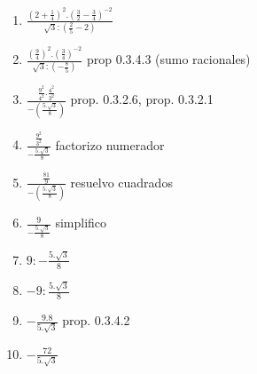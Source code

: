     \begin{enumerate}
        \item $ \frac{\left( 2+ \frac{1}{4} \right)^{2} . \left( \frac{3}{2}-\frac{3}{4} \right)^{-2}}{\sqrt{3}: \left( \frac{2}{5}-2 \right)} $ 
        
        \item $ \frac{ \left( \frac{9}{4} \right)^{2}. \left( \frac{3}{4} \right)^{-2}}{ \sqrt{3}:\left( -\frac{8}{5} \right)} $ prop 0.3.4.3 (sumo racionales)
        
        \item $ \frac{  \frac{9^2}{4^2} .  \frac{4^2}{3^2}  }{ - \left( \frac{5.\sqrt{3}}{8} \right)} $ prop. 0.3.2.6, prop. 0.3.2.1
               
        \item $ \frac{  \frac{9^2}{3^2}}{ -  \frac{5.\sqrt{3}}{8} }$ factorizo numerador
        
        \item $ \frac{ \frac{81}{9} }{ - \left( \frac{5.\sqrt{3}}{8} \right)}$ resuelvo cuadrados
        
        \item $ \frac{9}{ -\frac{5.\sqrt{3}}{8} }$ simplifico
        
        \item $ 9 :  - \frac{5.\sqrt{3}}{8} $
        
        \item $ - 9 :  \frac{5.\sqrt{3}}{8} $
        
        \item $ - \frac{9.8}{5.\sqrt{3}} $ prop. 0.3.4.2
        
        \item $ -\frac{72}{5.\sqrt{3}} $ 
        
        
    \end{enumerate}
    